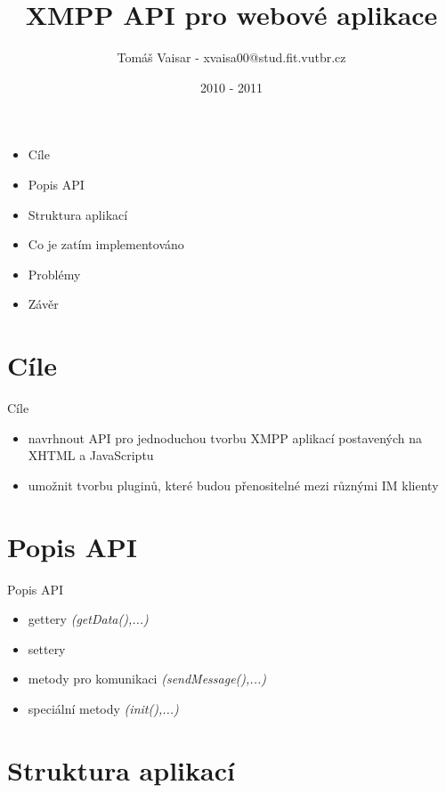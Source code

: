 \documentclass[9pt]{beamer}
\title{XMPP API pro webové aplikace}
\author{Tomáš Vaisar - xvaisa00@stud.fit.vutbr.cz}
\institute{Vysoké učení technické v Brně - fakulta informačních technologií}
\date{2010 - 2011}
\begin{document}
\begin{frame}
\titlepage
\end{frame}

\begin{frame}

	\begin{itemize}
		\item Cíle
		\item Popis API
		\item Struktura aplikací
		\item Co je zatím implementováno
		\item Problémy
		\item Závěr
	\end{itemize}

\end{frame}

\section{Cíle}

\begin{frame}{Cíle}

	\begin{itemize}
		\item navrhnout API pro jednoduchou tvorbu XMPP aplikací postavených na XHTML a JavaScriptu
		\item umožnit tvorbu pluginů, které budou přenositelné mezi různými IM klienty
	\end{itemize}
	
\end{frame}

\section{Popis API}

\begin{frame}{Popis API}
	\begin{itemize}
		\item gettery \textit{(getData(),...)}
		\item settery 
		\item metody pro komunikaci \textit{(sendMessage(),...)}
		\item speciální metody \textit{(init(),...)}
	\end{itemize}
\end{frame}

\section{Struktura aplikací}
\end{document}
